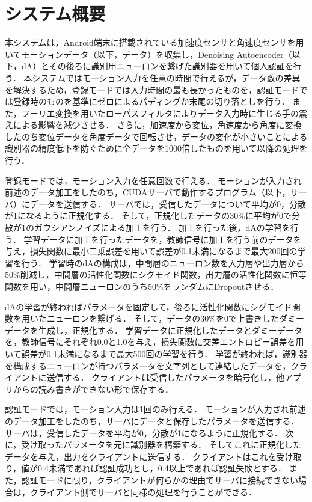 \section{システム概要}
本システムは，Android端末に搭載されている加速度センサと角速度センサを用いてモーションデータ（以下，データ）を収集し，Denoising Autoencoder（以下，dA）とその後ろに識別用ニューロンを繋げた識別器を用いて個人認証を行う．
本システムではモーション入力を任意の時間で行えるが，データ数の差異を解決するため，登録モードでは入力時間の最も長かったものを，認証モードでは登録時のものを基準にゼロによるパディングか末尾の切り落としを行う．
また，フーリエ変換を用いたローパスフィルタによりデータ入力時に生じる手の震えによる影響を減少させる．
さらに，加速度から変位，角速度から角度に変換したのち変位データを角度データで回転させ，データの変化が小さいことによる識別器の精度低下を防ぐために全データを1000倍したものを用いて以降の処理を行う．

登録モードでは，モーション入力を任意回数で行える．
モーションが入力され前述のデータ加工をしたのち，CUDAサーバで動作するプログラム（以下，サーバ）にデータを送信する．
サーバでは，受信したデータについて平均が0，分散が1になるように正規化する．
そして，正規化したデータの30\%に平均が0で分散が1のガウシアンノイズによる加工を行う．
加工を行った後，dAの学習を行う．
学習データに加工を行ったデータを，教師信号に加工を行う前のデータを与え，損失関数に最小二乗誤差を用いて誤差が0.1未満になるまで最大200回の学習を行う．
学習時のdAの構成は，中間層のニューロン数を入力層や出力層から50\%削減し，中間層の活性化関数にシグモイド関数，出力層の活性化関数に恒等関数を用い，中間層ニューロンのうち50\%をランダムにDropoutさせる．

dAの学習が終わればパラメータを固定して，後ろに活性化関数にシグモイド関数を用いたニューロンを繋げる．
そして，データの30\%を0で上書きしたダミーデータを生成し，正規化する．
学習データに正規化したデータとダミーデータを，教師信号にそれぞれ0.0と1.0を与え，損失関数に交差エントロピー誤差を用いて誤差が0.1未満になるまで最大500回の学習を行う．
学習が終われば，識別器を構成するニューロンが持つパラメータを文字列として連結したデータを，クライアントに送信する．
クライアントは受信したパラメータを暗号化し，他アプリからの読み書きができない形で保存する．

認証モードでは，モーション入力は1回のみ行える．
モーションが入力され前述のデータ加工をしたのち，サーバにデータと保存したパラメータを送信する．
サーバは，受信したデータを平均が0，分散が1になるように正規化する．
次に，受け取ったパラメータを元に識別器を構築する．
そしてこれに正規化したデータを与え，出力をクライアントに送信する．
クライアントはこれを受け取り，値が0.4未満であれば認証成功とし，0.4以上であれば認証失敗とする．
また，認証モードに限り，クライアントが何らかの理由でサーバに接続できない場合は，クライアント側でサーバと同様の処理を行うことができる．
